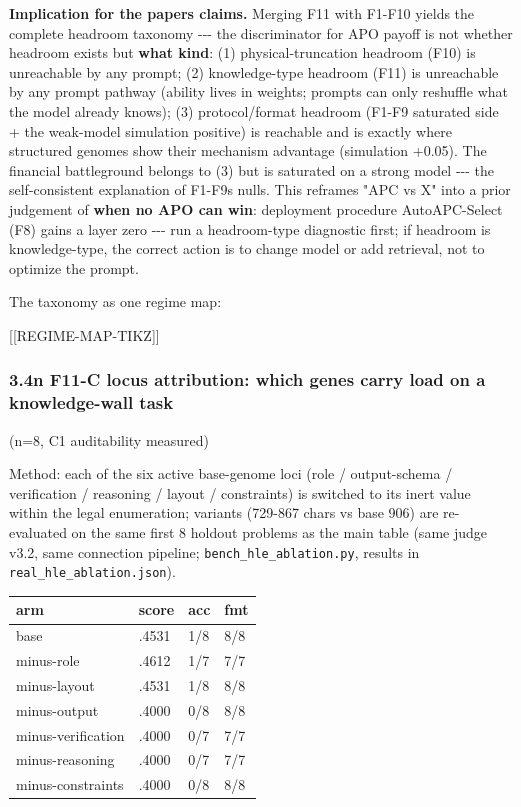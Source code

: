 \textbf{Implication for the paper\textquotesingle s claims.} Merging F11 with F1-F10 yields the complete headroom taxonomy -\/-\/- the discriminator for APO payoff is not whether headroom exists but \textbf{what kind}: (1) physical-truncation headroom (F10) is unreachable by any prompt; (2) knowledge-type headroom (F11) is unreachable by any prompt pathway (ability lives in weights; prompts can only reshuffle what the model already knows); (3) protocol/format headroom (F1-F9 saturated side + the weak-model simulation positive) is reachable and is exactly where structured genomes show their mechanism advantage (simulation +0.05). The financial battleground belongs to (3) but is saturated on a strong model -\/-\/- the self-consistent explanation of F1-F9\textquotesingle s nulls. This reframes "APC vs X" into a prior judgement of \textbf{when no APO can win}: deployment procedure AutoAPC-Select (F8) gains a layer zero -\/-\/- run a headroom-type diagnostic first; if headroom is knowledge-type, the correct action is to change model or add retrieval, not to optimize the prompt.

The taxonomy as one regime map:

{[}{[}REGIME-MAP-TIKZ{]}{]}

\subsubsection{3.4n F11-C locus attribution: which genes carry load on a knowledge-wall task}\label{34n-f11-c-locus-attribution-which-genes-carry-load-on-a-knowledge-wall-task}

(n=8, C1 auditability measured)

Method: each of the six active base-genome loci (role / output-schema / verification / reasoning / layout / constraints) is switched to its inert value within the legal enumeration; variants (729-867 chars vs base 906) are re-evaluated on the same first 8 holdout problems as the main table (same judge v3.2, same connection pipeline; \texttt{bench\_hle\_ablation.py}, results in \texttt{real\_hle\_ablation.json}).

\begin{longtable}[]{@{}llll@{}}
\toprule\noalign{}
arm & score & acc & fmt \\
\midrule\noalign{}
\endhead
\bottomrule\noalign{}
\endlastfoot
base & .4531 & 1/8 & 8/8 \\
minus-role & .4612 & 1/7 & 7/7 \\
minus-layout & .4531 & 1/8 & 8/8 \\
minus-output & .4000 & 0/8 & 8/8 \\
minus-verification & .4000 & 0/7 & 7/7 \\
minus-reasoning & .4000 & 0/7 & 7/7 \\
minus-constraints & .4000 & 0/8 & 8/8 \\
\end{longtable}

